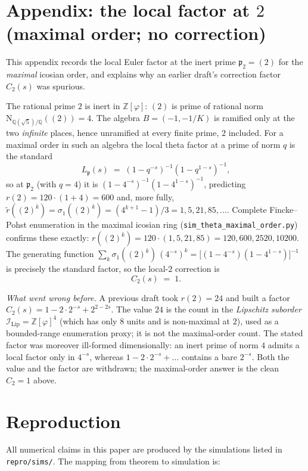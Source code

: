 \documentclass[11pt,a4paper]{article}
\theoremstyle{definition}
\theoremstyle{remark}
\newcommand{\Z}{\mathbb{Z}}
\newcommand{\IIlip}{\mathcal{I}_{\mathrm{Lip}}}
\newcommand{\NQ}{\mathrm{N}_{\mathbb{Q}(\sqrt{5})/\mathbb{Q}}}
\newcommand{\Zphi}{\Z[\varphi]}
\begin{document}
\bigskip

\section{Appendix: the local factor at $2$ (maximal order; no correction)}\label{sec:local-2}

This appendix records the local Euler factor at the inert prime
$\mathfrak{p}_2=(2)$ for the \emph{maximal} icosian order, and explains why
an earlier draft's correction factor $C_2(s)$ was spurious.

The rational prime $2$ is inert in $\Zphi$: $(2)$ is prime of rational norm
$\NQ((2))=4$. The algebra $B=(-1,-1/K)$ is ramified only at the two
\emph{infinite} places, hence unramified at every finite prime, $2$ included.
For a maximal order in such an algebra the local theta factor at a prime of
norm $q$ is the standard
\[
  L_{\mathfrak p}(s) \;=\; (1 - q^{-s})^{-1}(1 - q^{1-s})^{-1},
\]
so at $\mathfrak p_2$ (with $q=4$) it is $(1-4^{-s})^{-1}(1-4^{1-s})^{-1}$,
predicting $r(2)=120\cdot(1+4)=600$ and, more fully,
$\widetilde r((2)^k)=\sigma_1((2)^k)=(4^{k+1}-1)/3 = 1,5,21,85,\dots$.
Complete Fincke--Pohst enumeration in the maximal icosian ring
(\texttt{sim\_theta\_maximal\_order.py}) confirms these exactly:
$r((2)^k)=120\cdot(1,5,21,85)=120,600,2520,10200$. The generating function
$\sum_k \sigma_1((2)^k)\,(4^{-s})^k = \big[(1-4^{-s})(1-4^{1-s})\big]^{-1}$ is
precisely the standard factor, so the local-$2$ correction is
\[
  C_2(s) \;=\; 1.
\]

\emph{What went wrong before.} A previous draft took $r(2)=24$ and built a
factor $C_2(s)=1-2\cdot2^{-s}+2^{2-2s}$. The value $24$ is the count in the
\emph{Lipschitz suborder} $\IIlip=\Zphi^4$ (which has only $8$ units and is
non-maximal at $2$), used as a bounded-range enumeration proxy; it is not the
maximal-order count. The stated factor was moreover ill-formed dimensionally:
an inert prime of norm $4$ admits a local factor only in $4^{-s}$, whereas
$1-2\cdot2^{-s}+\dots$ contains a bare $2^{-s}$. Both the value and the factor
are withdrawn; the maximal-order answer is the clean $C_2=1$ above.

\bigskip

\section{Reproduction}\label{sec:repro}

All numerical claims in this paper are produced by the simulations listed in
\texttt{repro/sims/}. The mapping from theorem to simulation is:
\end{document}
